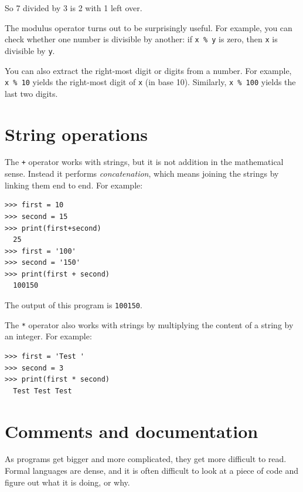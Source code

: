 So 7 divided by 3 is 2 with 1 left over.

The modulus operator turns out to be surprisingly useful. For example, you can check whether one number is divisible by another: if
\texttt{x\ \%\ y} is zero, then \texttt{x} is divisible by \texttt{y}.


You can also extract the right-most digit or digits from a number. For example, \texttt{x\ \%\ 10} yields the right-most digit of \texttt{x} (in base 10). Similarly,
\texttt{x\ \%\ 100} yields the last two digits.

\hypertarget{operaciones-con-cadenas}{%
\section{String operations
}\label{operaciones-con-cadenas}}

 

The \texttt{+} operator works with strings, but it is not addition in the mathematical sense. Instead it performs \emph{concatenation}, which means joining the strings by linking them end to end. For example:


\begin{Verbatim}[frame=single]
>>> first = 10
>>> second = 15
>>> print(first+second)
  25
>>> first = '100'
>>> second = '150'
>>> print(first + second)
  100150
\end{Verbatim}

The output of this program is \texttt{100150}.

The \texttt{*} operator also works with strings by multiplying the content of a string by an integer. For example:

\begin{Verbatim}[frame=single]
>>> first = 'Test '
>>> second = 3
>>> print(first * second)
  Test Test Test
\end{Verbatim}

\hypertarget{comentarios}{%
\section{Comments and documentation}\label{comentarios}}


As programs get bigger and more complicated, they get more difficult to read. Formal languages are dense, and it is often difficult to look at a piece of code and figure out what it is doing, or why.

